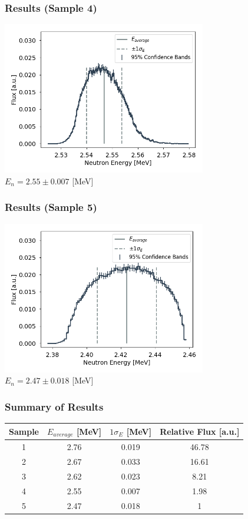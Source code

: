 \documentclass[12pt,xcolor=dvipsnames]{beamer}
\begin{document}
\begin{frame}
\frametitle{Results (Sample 4)}
\centering
\includegraphics[width=3.5in]{3609False.png}\\
$E_n=2.55\pm 0.007$ [MeV]
\end{frame}

\begin{frame}
\frametitle{Results (Sample 5)}
\centering
\includegraphics[width=3.5in]{-7046True.png}\\
$E_n=2.47\pm 0.018$ [MeV]
\end{frame}

\begin{frame}
\frametitle{Summary of Results}
\begin{center}
\begin{tabular}{c|ccc}
\hline 
Sample & $E_{average}$ [MeV] & $1\sigma_E$ [MeV] & Relative Flux [a.u.] \\ 
\hline 
1 & 2.76 & 0.019 & 46.78 \\ 
2 & 2.67 & 0.033 & 16.61 \\ 
3 & 2.62 & 0.023 & 8.21 \\ 
4 & 2.55 & 0.007 & 1.98 \\ 
5 & 2.47 & 0.018 & 1 \\ 
\hline 
\end{tabular}
\end{center}
\end{frame}
\end{document}
